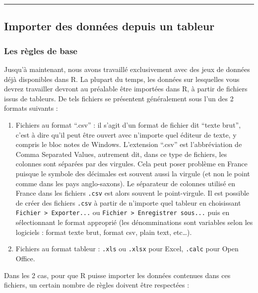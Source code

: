 \documentclass[a4paperpaper,]{article}
\providecommand{\tightlist}{%
  \setlength{\itemsep}{0pt}\setlength{\parskip}{0pt}}
\begin{document}
\begin{center}\rule{0.5\linewidth}{\linethickness}\end{center}

\hypertarget{importer-des-donnees-depuis-un-tableur}{%
\subsection{Importer des données depuis un tableur}\label{importer-des-donnees-depuis-un-tableur}}

\hypertarget{les-regles-de-base}{%
\subsubsection{Les règles de base}\label{les-regles-de-base}}

Jusqu'à maintenant, nous avons travaillé exclusivement avec des jeux de données déjà disponibles dans R. La plupart du temps, les données sur lesquelles vous devrez travailler devront au préalable être importées dans R, à partir de fichiers issus de tableurs. De tels fichiers se présentent généralement sous l'un des 2 formats suivants :

\begin{enumerate}
\def\labelenumi{\arabic{enumi}.}
\tightlist
\item
  Fichiers au format ``.csv'' : il s'agit d'un format de fichier dit ``texte brut'', c'est à dire qu'il peut être ouvert avec n'importe quel éditeur de texte, y compris le bloc notes de Windows. L'extension ``.csv'' est l'abbréviation de Comma Separated Values, autrement dit, dans ce type de fichiers, les colonnes sont séparées par des virgules. Cela peut poser problème en France puisque le symbole des décimales est souvent aussi la virgule (et non le point comme dans les pays anglo-saxons). Le séparateur de colonnes utilisé en France dans les fichiers \texttt{.csv} est alors souvent le point-virgule. Il est possible de créer des fichiers \texttt{.csv} à partir de n'importe quel tableur en choisissant \texttt{Fichier\ \textgreater{}\ Exporter...} ou \texttt{Fichier\ \textgreater{}\ Enregistrer\ sous...} puis en sélectionnant le format approprié (les dénomminations sont variables selon les logiciels : format texte brut, format csv, plain text, etc\ldots{}).
\item
  Fichiers au format tableur : \texttt{.xls} ou \texttt{.xlsx} pour Excel, \texttt{.calc} pour Open Office.
\end{enumerate}

Dans les 2 cas, pour que R puisse importer les données contenues dans ces fichiers, un certain nombre de règles doivent être respectées :
\end{document}
